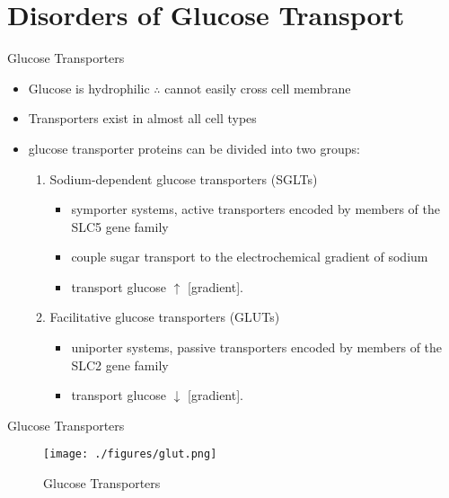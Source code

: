 \documentclass[presentation, smaller]{beamer}
\begin{document}
\section{Disorders of Glucose Transport}
\label{sec:org9c5cdd8}
\begin{frame}[label={sec:orgb05ed4e}]{Glucose Transporters}
\begin{itemize}
\item Glucose is hydrophilic \(\therefore\) cannot easily cross cell membrane
\item Transporters exist in almost all cell types
\item glucose transporter proteins can be divided into two groups:
\begin{enumerate}
\item Sodium-dependent glucose transporters (SGLTs)
\begin{itemize}
\item symporter systems, active transporters encoded by members of
the SLC5 gene family
\item couple sugar transport to the electrochemical gradient of sodium
\item transport glucose \(\uparrow\) [gradient].
\end{itemize}
\item Facilitative glucose transporters (GLUTs)
\begin{itemize}
\item uniporter systems, passive transporters encoded by members of the SLC2 gene family
\item transport glucose \(\downarrow\) [gradient].
\end{itemize}
\end{enumerate}
\end{itemize}
\end{frame}

\begin{frame}[label={sec:org5203223}]{Glucose Transporters}
\begin{figure}[htbp]
\centering
\texttt{[image: ./figures/glut.png]}
\caption[glucose transporters]{\label{fig:org52a30d9}
Glucose Transporters}
\end{figure}
\end{frame}
\end{document}
